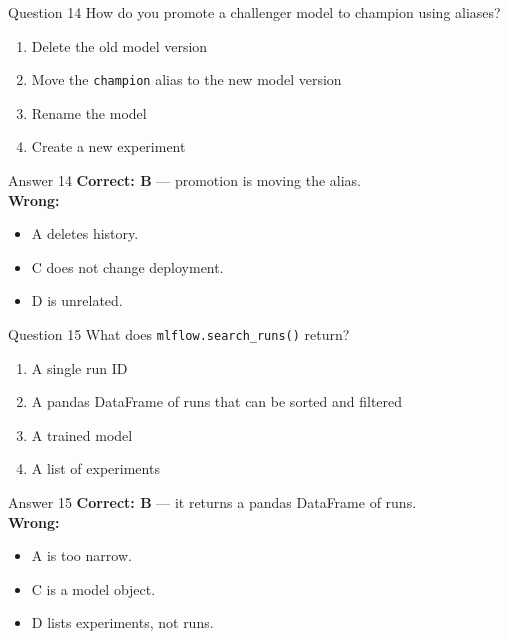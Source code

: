 \documentclass[aspectratio=169,11pt]{beamer}
\begin{document}
	\begin{frame}{Question 14}
		How do you promote a challenger model to champion using aliases?
		\begin{enumerate}[label=\Alph*.]
			\item Delete the old model version
			\item Move the \texttt{champion} alias to the new model version
			\item Rename the model
			\item Create a new experiment
		\end{enumerate}
	\end{frame}
	\begin{frame}{Answer 14}
		\textbf{Correct: B} --- promotion is moving the alias.\\
		\vspace{0.5em}
		\textbf{Wrong:}
		\begin{itemize}
			\item A deletes history.
			\item C does not change deployment.
			\item D is unrelated.
		\end{itemize}
	\end{frame}
	
	\begin{frame}{Question 15}
		What does \texttt{mlflow.search\_runs()} return?
		\begin{enumerate}[label=\Alph*.]
			\item A single run ID
			\item A pandas DataFrame of runs that can be sorted and filtered
			\item A trained model
			\item A list of experiments
		\end{enumerate}
	\end{frame}
	\begin{frame}{Answer 15}
		\textbf{Correct: B} --- it returns a pandas DataFrame of runs.\\
		\vspace{0.5em}
		\textbf{Wrong:}
		\begin{itemize}
			\item A is too narrow.
			\item C is a model object.
			\item D lists experiments, not runs.
		\end{itemize}
	\end{frame}
	
\end{document}
